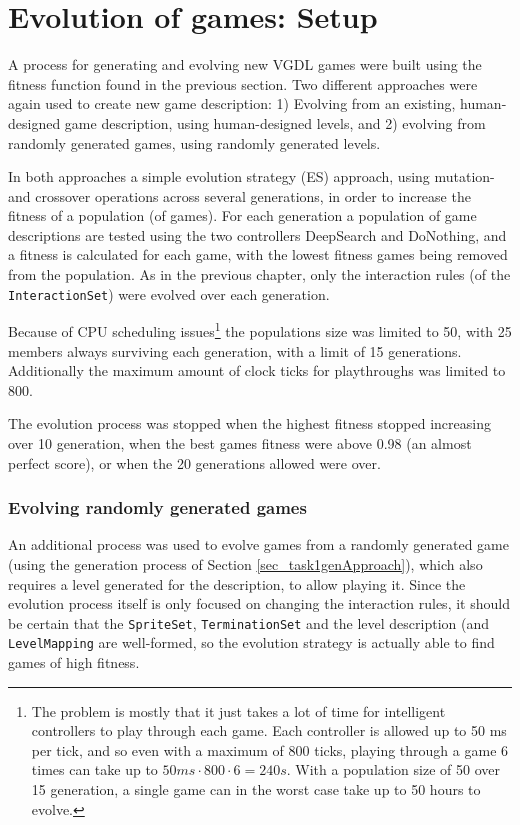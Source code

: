 \documentclass[a4paper,titlepage,final]{report}
\begin{document}

\section{Evolution of games: Setup}
\label{sec_task2evolvingGames}
A process for generating and evolving new VGDL games were built using the fitness function found in the previous section.
Two different approaches were again used to create new game description:
1) Evolving from an existing, human-designed game description, using human-designed levels, and 2) evolving from randomly generated games, using randomly generated levels.

In both approaches a simple evolution strategy (ES) approach, using mutation- and crossover operations across several generations, in order to increase the fitness of a population (of games).
For each generation a population of game descriptions are tested using the two controllers DeepSearch and DoNothing, and a fitness is calculated for each game, with the lowest fitness games being removed from the population.
As in the previous chapter, only the interaction rules (of the \texttt{InteractionSet}) were evolved over each generation.

Because of CPU scheduling issues\footnote{The problem is mostly that it just takes a lot of time for intelligent controllers to play through each game. Each controller is allowed up to 50 ms per tick, and so even with a maximum of 800 ticks, playing through a game 6 times can take up to $50ms \cdot 800 \cdot  6 = 240s$. With a population size of 50 over 15 generation, a single game can in the worst case take up to 50 hours to evolve.} the populations size was limited to 50, with 25 members always surviving each generation, with a limit of 15 generations.
Additionally the maximum amount of clock ticks for playthroughs was limited to 800.

The evolution process was stopped when the highest fitness stopped increasing over 10 generation, when the best games fitness were above 0.98 (an almost perfect score), or when the 20 generations allowed were over.



\subsubsection*{Evolving randomly generated games}
An additional process was used to evolve games from a randomly generated game (using the generation process of Section \ref{sec_task1genApproach}), which also requires a level generated for the description, to allow playing it.
Since the evolution process itself is only focused on changing the interaction rules, it should be certain that the \texttt{SpriteSet}, \texttt{TerminationSet} and the level description (and \texttt{LevelMapping} are well-formed, so the evolution strategy is actually able to find games of high fitness.
\end{document}
